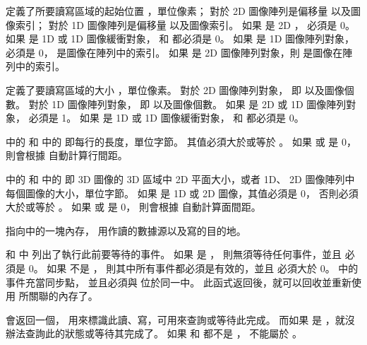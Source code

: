  定義了所要讀寫區域的起始位置 ，單位像素；
對於 2D 圖像陣列是偏移量  以及圖像索引；
對於 1D 圖像陣列是偏移量  以及圖像索引。
如果  是 2D ，  必須是 0。
如果  是 1D 或 1D 圖像緩衝對象，
 和  都必須是 0。
如果  是 1D 圖像陣列對象，
 必須是 0，  是圖像在陣列中的索引。
如果  是 2D 圖像陣列對象，則  是圖像在陣列中的索引。

 定義了要讀寫區域的大小 ，單位像素。
對於 2D 圖像陣列對象， 即  以及圖像個數。
對於 1D 圖像陣列對象， 即  以及圖像個數。
如果  是 2D 或 1D 圖像陣列對象，  必須是 1。
如果  是 1D 或 1D 圖像緩衝對象，
 和  都必須是 0。

 中的 
和  中的  即每行的長度，單位字節。
其值必須大於或等於 。
如果  或  是 0，
則會根據  自動計算行間距。

 中的 
和  中的 
即 3D 圖像的 3D 區域中 2D 平面大小，或者 1D、 2D 圖像陣列中每個圖像的大小，單位字節。
如果  是 1D 或 2D 圖像，其值必須是 0，
否則必須大於或等於 。
如果  或  是 0，
則會根據  自動計算面間距。

 指向中的一塊內存，
用作讀的數據源以及寫的目的地。

 和  中
列出了執行此前要等待的事件。
如果  是 ，
則無須等待任何事件，並且  必須是 0。
如果  不是 ，
則其中所有事件都必須是有效的，並且  必須大於 0。
 中的事件充當同步點，
並且必須與  位於同一中。
此函式返回後，就可以回收並重新使用  所關聯的內存了。

 會返回一個，
用來標識此讀、寫，可用來查詢或等待此完成。
而如果  是 ，就沒辦法查詢此的狀態或等待其完成了。
如果  和  都不是 ，
 不能屬於 。

